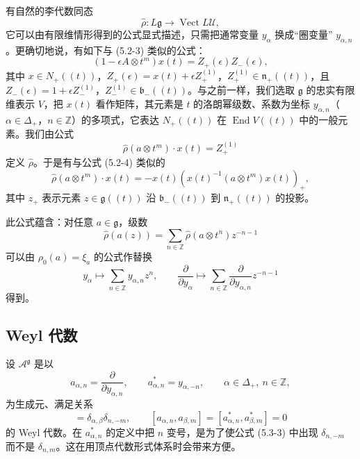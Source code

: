 有自然的李代数同态
\[
    \widehat{\rho}:L\mathfrak{g}\to\operatorname{Vect}L\mathcal{U},
\]
它可以由有限维情形得到的公式显式描述，只需把通常变量 $y_\alpha$ 换成“圈变量” $y_{\alpha,n}$。更确切地说，有如下与 (5.2-3) 类似的公式：
\[
    (1-\epsilon A\otimes t^m)x(t)=Z_+(\epsilon)Z_-(\epsilon),
\]
其中 $x\in N_+((t))$，$Z_+(\epsilon)=x(t)+\epsilon Z_+^{(1)}$，$Z_+^{(1)}\in\mathfrak{n}_+((t))$，且 $Z_-(\epsilon)=1+\epsilon Z_-^{(1)}$，$Z_-^{(1)}\in\mathfrak{b}_-((t))$。与之前一样，我们选取 $\mathfrak{g}$ 的忠实有限维表示 $V$，把 $x(t)$ 看作矩阵，其元素是 $t$ 的洛朗幂级数、系数为坐标 $y_{\alpha,n}$（$\alpha\in\Delta_+$，$n\in\mathbb{Z}$）的多项式，它表达 $N_+((t))$ 在 $\operatorname{End}V((t))$ 中的一般元素。我们由公式
\[
    \widehat{\rho}(a\otimes t^m)\cdot x(t)=Z_+^{(1)}
\]
定义 $\widehat{\rho}$。于是有与公式 (5.2-4) 类似的
\begin{equation}
    \widehat{\rho}(a\otimes t^m)\cdot x(t)
    =-x(t)\left(x(t)^{-1}(a\otimes t^m)x(t)\right)_+ ,
    \tag{5.3-2}
\end{equation}
其中 $z_+$ 表示元素 $z\in\mathfrak{g}((t))$ 沿 $\mathfrak{b}_-((t))$ 到 $\mathfrak{n}_+((t))$ 的投影。


此公式蕴含：对任意 $a\in\mathfrak{g}$，级数
\[
    \widehat{\rho}(a(z))=\sum_{n\in\mathbb{Z}}\widehat{\rho}(a\otimes t^n)z^{-n-1}
\]
可以由 $\rho_0(a)=\xi_a$ 的公式作替换
\[
    y_\alpha\mapsto\sum_{n\in\mathbb{Z}}y_{\alpha,n}z^{n},
    \qquad
    \frac{\partial}{\partial y_\alpha}\mapsto
    \sum_{n\in\mathbb{Z}}\frac{\partial}{\partial y_{\alpha,n}}z^{-n-1}
\]
得到。

\subsection{Weyl 代数}

设 $\mathcal{A}^{\mathfrak{g}}$ 是以
\[
    a_{\alpha,n}=\frac{\partial}{\partial y_{\alpha,n}},
    \qquad
    a^*_{\alpha,n}=y_{\alpha,-n},
    \qquad
    \alpha\in\Delta_+,\ n\in\mathbb{Z},
\]
为生成元、满足关系
\begin{equation}
    [a_{\alpha,n},a^*_{\beta,m}]=\delta_{\alpha,\beta}\delta_{n,-m},
    \qquad
    [a_{\alpha,n},a_{\beta,m}]=[a^*_{\alpha,n},a^*_{\beta,m}]=0
    \tag{5.3-3}
\end{equation}
的 Weyl 代数。在 $a^*_{\alpha,n}$ 的定义中把 $n$ 变号，是为了使公式 (5.3-3) 中出现 $\delta_{n,-m}$ 而不是 $\delta_{n,m}$。这在用顶点代数形式体系时会带来方便。

